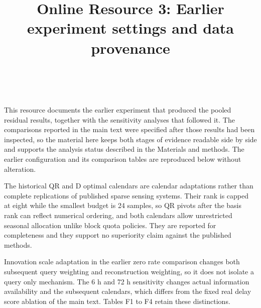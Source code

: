 \documentclass[lineno,pdflatex,sn-apa]{sn-jnl}%
\theoremstyle{thmstyleone}%
\theoremstyle{thmstyletwo}%
\theoremstyle{thmstylethree}%
\begin{document}
\title[Online Resource 3]{Online Resource 3: Earlier experiment settings and data provenance}



\author*[1,2]{ \,}










\maketitle



This resource documents the earlier experiment that produced the pooled residual results, together with the sensitivity analyses that followed it. The comparisons reported in the main text were specified after those results had been inspected, so the material here keeps both stages of evidence readable side by side and supports the analysis status described in the Materials and methods. The earlier configuration and its comparison tables are reproduced below without alteration.

The historical QR and D optimal calendars are calendar adaptations rather than complete replications of published sparse sensing systems. Their rank is capped at eight while the smallest budget is 24 samples, so QR pivots after the basis rank can reflect numerical ordering, and both calendars allow unrestricted seasonal allocation unlike block quota policies. They are reported for completeness and they support no superiority claim against the published methods.

Innovation scale adaptation in the earlier zero rate comparison changes both subsequent query weighting and reconstruction weighting, so it does not isolate a query only mechanism. The 6 h and 72 h sensitivity changes actual information availability and the subsequent calendars, which differs from the fixed real delay score ablation of the main text. Tables F1 to F4 retain these distinctions.
\end{document}
